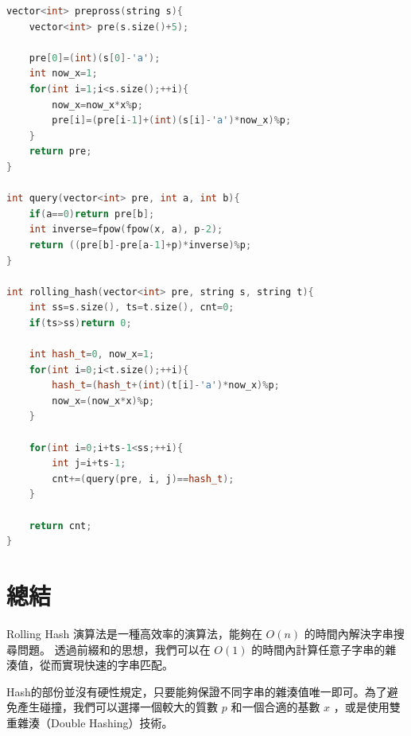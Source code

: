 \begin{lstlisting}[language=C++]
vector<int> prepross(string s){
    vector<int> pre(s.size()+5);

    pre[0]=(int)(s[0]-'a');
    int now_x=1;
    for(int i=1;i<s.size();++i){
        now_x=now_x*x%p;
        pre[i]=(pre[i-1]+(int)(s[i]-'a')*now_x)%p;
    }
    return pre;
}

int query(vector<int> pre, int a, int b){
    if(a==0)return pre[b];
    int inverse=fpow(fpow(x, a), p-2);
    return ((pre[b]-pre[a-1]+p)*inverse)%p;
}

int rolling_hash(vector<int> pre, string s, string t){
    int ss=s.size(), ts=t.size(), cnt=0;
    if(ts>ss)return 0;

    int hash_t=0, now_x=1;
    for(int i=0;i<t.size();++i){
        hash_t=(hash_t+(int)(t[i]-'a')*now_x)%p;
        now_x=(now_x*x)%p;
    }

    for(int i=0;i+ts-1<ss;++i){
        int j=i+ts-1;
        cnt+=(query(pre, i, j)==hash_t);
    }

    return cnt;
}
\end{lstlisting}

\section{總結}
Rolling Hash 演算法是一種高效率的演算法，能夠在 $O(n)$ 的時間內解決字串搜尋問題。
透過前綴和的思想，我們可以在 $O(1)$ 的時間內計算任意子字串的雜湊值，從而實現快速的字串匹配。

Hash的部份並沒有硬性規定，只要能夠保證不同字串的雜湊值唯一即可。為了避免產生碰撞，我們可以選擇一個較大的質數 $p$ 和一個合適的基數 $x$
，或是使用雙重雜湊（Double Hashing）技術。
